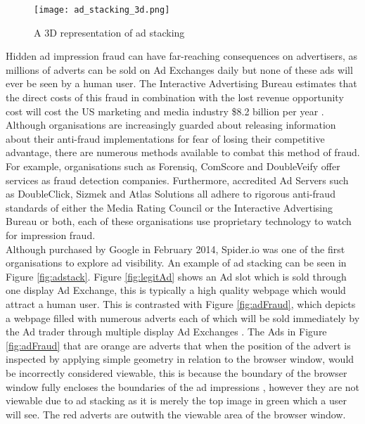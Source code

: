 \documentclass[12pt]{article}
\begin{document}
\begin{figure}[H]
    \centering
    \texttt{[image: ad\_stacking\_3d.png]}
    \caption{A 3D representation of ad stacking}
    \label{fig:ad_stacking_3d}
\end{figure}

Hidden ad impression fraud can have far-reaching consequences on advertisers, as millions of adverts can be sold on Ad Exchanges daily but none of these ads will ever be seen by a human user. The Interactive Advertising Bureau estimates that the direct costs of this fraud in combination with the lost revenue opportunity cost will cost the US marketing and media industry \$8.2 billion per year \parencite{iabfraud}. Although organisations are increasingly guarded about releasing information about their anti-fraud implementations for fear of losing their competitive advantage, there are numerous methods available to combat this method of fraud. For example, organisations such as Forensiq, ComScore and DoubleVeify offer services as fraud detection companies. Furthermore, accredited Ad Servers such as DoubleClick, Sizmek and Atlas Solutions all adhere to rigorous anti-fraud standards of either the Media Rating Council or the Interactive Advertising Bureau or both, each of these organisations use proprietary technology to watch for impression fraud. \\

Although purchased by Google in February 2014, Spider.io was one of the first organisations to explore ad visibility. An example of ad stacking can be seen in Figure \ref{fig:adstack}. Figure \ref{fig:legitAd} shows an Ad slot which is sold through one display Ad Exchange, this is typically a high quality webpage which would attract a human user. This is contrasted with Figure \ref{fig:adFraud}, which depicts a webpage filled with numerous adverts each of which will be sold immediately by the Ad trader through multiple display Ad Exchanges \parencite{spiderIo}. The Ads in Figure \ref{fig:adFraud} that are orange are adverts that when the position of the advert is inspected by applying simple geometry in relation to the browser window, would be incorrectly considered viewable, this is because the boundary of the browser window fully encloses the boundaries of the ad impressions \parencite{spiderIo}, however they are not viewable due to ad stacking as it is merely the top image in green which a user will see. The red adverts are outwith the viewable area of the browser window.  \\ 
\end{document}
